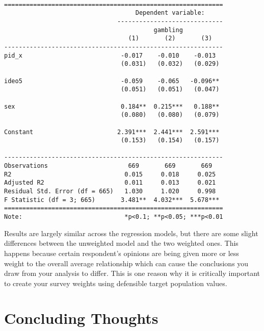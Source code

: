 \documentclass[
  letterpaper,
  DIV=11,
  numbers=noendperiod]{scrreprt}
\begin{document}
\begin{verbatim}

============================================================
                                    Dependent variable:     
                               -----------------------------
                                         gambling           
                                  (1)       (2)       (3)   
------------------------------------------------------------
pid_x                           -0.017    -0.010    -0.013  
                                (0.031)   (0.032)   (0.029) 
                                                            
ideo5                           -0.059    -0.065   -0.096** 
                                (0.051)   (0.051)   (0.047) 
                                                            
sex                             0.184**  0.215***   0.188** 
                                (0.080)   (0.080)   (0.079) 
                                                            
Constant                       2.391***  2.441***  2.591*** 
                                (0.153)   (0.154)   (0.157) 
                                                            
------------------------------------------------------------
Observations                      669       669       669   
R2                               0.015     0.018     0.025  
Adjusted R2                      0.011     0.013     0.021  
Residual Std. Error (df = 665)   1.030     1.020     0.998  
F Statistic (df = 3; 665)       3.481**  4.032***  5.678*** 
============================================================
Note:                            *p<0.1; **p<0.05; ***p<0.01
\end{verbatim}

Results are largely similar across the regression models, but there are
some slight differences between the unweighted model and the two
weighted ones. This happens because certain respondent's opinions are
being given more or less weight to the overall average relationship
which can cause the conclusions you draw from your analysis to differ.
This is one reason why it is critically important to create your survey
weights using defensible target population values.

\hypertarget{concluding-thoughts}{%
\section{Concluding Thoughts}\label{concluding-thoughts}}
\end{document}
